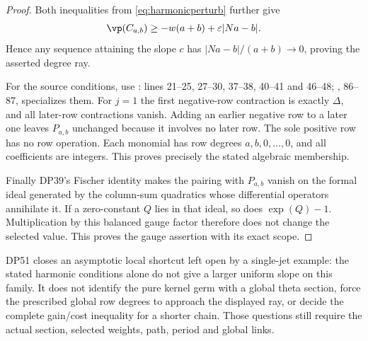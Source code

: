 \begin{proof}
Both inequalities from \eqref{eq:harmonicperturb} further give
\[
 \vp(C_{a,b})\ge-w(a+b)+\varepsilon|Na-b|.
\]
Hence any sequence attaining the slope $c$ has
$|Na-b|/(a+b)\to0$, proving the asserted degree ray.

For the source conditions, use :  lines 21--25,
 27--30,  37--38,  40--41 and
 46--48; ,  86--87, specializes them.
For $j=1$ the first negative-row contraction is exactly $\Delta$, and all later-row contractions vanish.
Adding an earlier negative row to a later one leaves $P_{a,b}$ unchanged because it involves no later row.
The sole positive row has no row operation.
Each monomial has row degrees $a,b,0,\ldots,0$, and all coefficients are integers.
This proves precisely the stated algebraic  membership.

Finally DP39's Fischer identity makes the pairing with $P_{a,b}$ vanish on the formal ideal generated by the column-sum quadratics whose differential operators annihilate it.
If a zero-constant $Q$ lies in that ideal, so does $\exp(Q)-1$.
Multiplication by this balanced gauge factor therefore does not change the selected value.
This proves the gauge assertion with its exact scope.
\end{proof}

DP51 closes an asymptotic local shortcut left open by a single-jet example:
the stated harmonic conditions alone do not give a larger uniform slope on this family.
It does not identify the pure kernel germ with a global theta section, force the prescribed global row degrees to approach the displayed ray, or decide the complete gain/cost inequality for a shorter chain.
Those questions still require the actual section, selected weights, path, period and global links.

